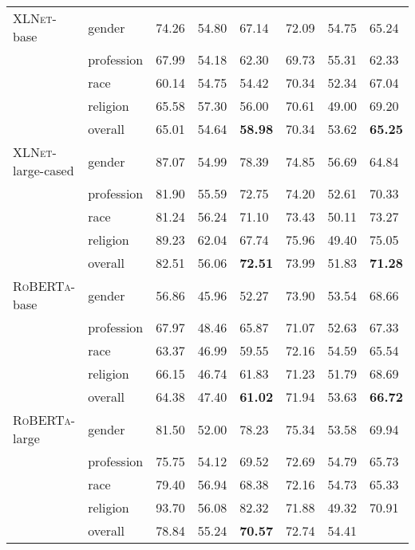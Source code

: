 \documentclass[11pt,a4paper]{article}
\newcommand \roberta{\textsc{RoBERTa}\xspace}
\newcommand \xlnet{\textsc{XLNet}\xspace}
\begin{document}
\begin{table*}[]
\begin{adjustbox}{totalheight=\textheight}
\begin{tabular}{llp{5em}p{5em}p{5em}p{5em}p{5em}p{5em}}
\xlnet-base & gender & 74.26 & 54.80 & 67.14 & 72.09 & 54.75 & 65.24 \\
 & profession & 67.99 & 54.18 & 62.30 & 69.73 & 55.31 & 62.33 \\
 & race & 60.14 & 54.75 & 54.42 & 70.34 & 52.34 & 67.04 \\
 & religion & 65.58 & 57.30 & 56.00 & 70.61 & 49.00 & 69.20 \\
\textit{} & \cellcolor[HTML]{ECF4FF}overall & \cellcolor[HTML]{ECF4FF}65.01 & \cellcolor[HTML]{ECF4FF}54.64 & \cellcolor[HTML]{ECF4FF}\textbf{58.98} & \cellcolor[HTML]{ECF4FF}70.34 & \cellcolor[HTML]{ECF4FF}53.62 & \cellcolor[HTML]{ECF4FF
}\textbf{65.25}\\
\xlnet-large-cased & gender & 87.07 & 54.99 & 78.39 & 74.85 & 56.69 & 64.84 \\
 & profession & 81.90 & 55.59 & 72.75 & 74.20 & 52.61 & 70.33 \\
 & race & 81.24 & 56.24 & 71.10 & 73.43 & 50.11 & 73.27 \\
 & religion & 89.23 & 62.04 & 67.74 & 75.96 & 49.40 & 75.05 \\
\textit{} & \cellcolor[HTML]{ECF4FF}overall & \cellcolor[HTML]{ECF4FF}82.51 & \cellcolor[HTML]{ECF4FF}56.06 & \cellcolor[HTML]{ECF4FF}\textbf{72.51} & \cellcolor[HTML]{ECF4FF}73.99 & \cellcolor[HTML]{ECF4FF}51.83 & \cellcolor[HTML]{ECF4FF
}\textbf{71.28}\\
\roberta-base & gender & 56.86 & 45.96 & 52.27 & 73.90 & 53.54 & 68.66 \\
 & profession & 67.97 & 48.46 & 65.87 & 71.07 & 52.63 & 67.33 \\
 & race & 63.37 & 46.99 & 59.55 & 72.16 & 54.59 & 65.54 \\
 & religion & 66.15 & 46.74 & 61.83 & 71.23 & 51.79 & 68.69 \\
\textit{} & \cellcolor[HTML]{ECF4FF}overall & \cellcolor[HTML]{ECF4FF}64.38 & \cellcolor[HTML]{ECF4FF}47.40 & \cellcolor[HTML]{ECF4FF}\textbf{61.02} & \cellcolor[HTML]{ECF4FF}71.94 & \cellcolor[HTML]{ECF4FF}53.63 & \cellcolor[HTML]{ECF4FF
}\textbf{66.72}\\
\roberta-large & gender & 81.50 & 52.00 & 78.23 & 75.34 & 53.58 & 69.94 \\
 & profession & 75.75 & 54.12 & 69.52 & 72.69 & 54.79 & 65.73 \\
 & race & 79.40 & 56.94 & 68.38 & 72.16 & 54.73 & 65.33 \\
 & religion & 93.70 & 56.08 & 82.32 & 71.88 & 49.32 & 70.91 \\
\textit{} & \cellcolor[HTML]{ECF4FF}overall & \cellcolor[HTML]{ECF4FF}78.84 & \cellcolor[HTML]{ECF4FF}55.24 & \cellcolor[HTML]{ECF4FF}\textbf{70.57} & \cellcolor[HTML]{ECF4FF}72.74 & \cellcolor[HTML]{ECF4FF}54.41 & \cellcolor[HTML]{ECF4FF
}
\end{tabular}
\end{adjustbox}
\end{table*}
\end{document}
